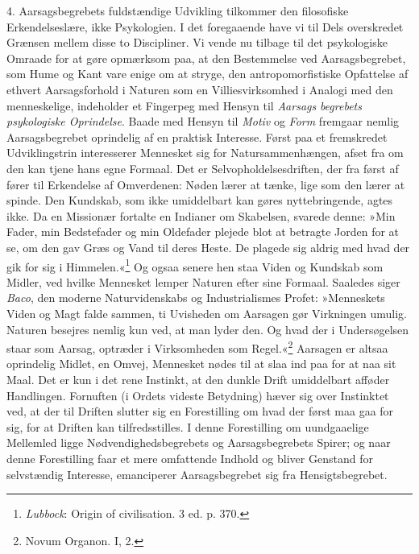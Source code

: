\documentclass[12pt,a4paper,openany]{book}
\newcommand{\opage}[1]{\marginnote{\footnotesize\textit{[#1]}}}
\begin{document}
4. Aarsagsbegrebets fuldstændige Udvikling tilkommer den filosofiske
Erkendelseslære, ikke Psykologien. I det foregaaende have vi til Dels
overskredet Grænsen mellem disse to Discipliner. Vi vende nu tilbage til
det psykologiske Omraade for at gøre opmærksom paa, at den Bestemmelse
ved Aarsagsbegrebet, som Hume og Kant vare enige om at stryge, den
antropomorfistiske Opfattelse af ethvert Aarsagsforhold i Naturen som en
Villiesvirksomhed i Analogi med den menneskelige, indeholder et
Fingerpeg med Hensyn til \emph{Aarsags}%
\opage{261}\emph{begrebets psykologiske Oprindelse}. Baade med Hensyn
til \emph{Motiv} og \emph{Form} fremgaar nemlig Aarsagsbegrebet
oprindelig af en praktisk Interesse. Først paa et fremskredet
Udviklingstrin interesserer Mennesket sig for Natursammenhængen, afset
fra om den kan tjene hans egne Formaal. Det er Selvopholdelsesdriften,
der fra først af fører til Erkendelse af Omverdenen: Nøden lærer at
tænke, lige som den lærer at spinde. Den Kundskab, som ikke umiddelbart
kan gøres nyttebringende, agtes ikke. Da en Missionær fortalte en
Indianer om Skabelsen, svarede denne: »Min Fader, min Bedstefader og min
Oldefader plejede blot at betragte Jorden for at se, om den gav Græs og
Vand til deres Heste. De plagede sig aldrig med hvad der gik for sig i
Himmelen.«\footnote[1]{\emph{Lubbock}: Origin of civilisation. 3 ed. p. 370.}
Og ogsaa senere hen staa Viden og Kundskab som Midler, ved hvilke
Mennesket lemper Naturen efter sine Formaal. Saaledes siger \emph{Baco},
den moderne Naturvidenskabs og Industrialismes Profet: »Menneskets Viden
og Magt falde sammen, ti Uvisheden om Aarsagen gør Virkningen umulig.
Naturen besejres nemlig kun ved, at man lyder den. Og hvad der i
Undersøgelsen staar som Aarsag, optræder i Virksomheden som
Regel.«\footnote[2]{Novum Organon. I, 2.} Aarsagen er altsaa oprindelig
Midlet, en Omvej, Mennesket nødes til at slaa ind paa for at naa sit
Maal. Det er kun i det rene Instinkt, at den dunkle Drift umiddelbart
afføder Handlingen. Fornuften (i Ordets videste Betydning) hæver sig
over Instinktet ved, at der til Driften slutter sig en Forestilling om
hvad der først maa gaa for sig, for at Driften kan tilfredsstilles. I
denne Forestilling om uundgaaelige Mellemled ligge
Nødvendighedsbegrebets og Aarsagsbegrebets Spirer; og naar denne
Forestilling faar et mere omfattende Indhold og bliver Genstand for
selvstændig Interesse, emanciperer Aarsagsbegrebet sig fra
Hensigtsbegrebet.
\end{document}
